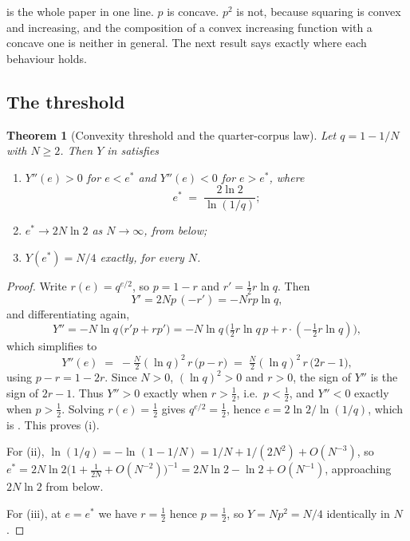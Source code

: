\documentclass[11pt,twocolumn,a4paper]{article}
\theoremstyle{thmstyle}
\newtheorem{theorem}{Theorem}[section]
\theoremstyle{definition}
\theoremstyle{remark}
\newcommand{\eff}{e}
\newcommand{\estar}{e^{*}}
\newcommand{\yield}{Y}
\begin{document}
 is the whole paper in one line. $p$ is concave. $p^{2}$
is not, because squaring is convex and increasing, and the composition of
a convex increasing function with a concave one is neither in general.
The next result says exactly where each behaviour holds.

\subsection{The threshold}

\begin{theorem}[Convexity threshold and the quarter-corpus law]
\label{thm:threshold}
Let $q=1-1/N$ with $N\ge2$. Then $\yield$ in  satisfies
\begin{enumerate}[label=(\roman*),leftmargin=1.8em,itemsep=2pt]
\item $\yield''(\eff)>0$ for $\eff<\estar$ and $\yield''(\eff)<0$ for
$\eff>\estar$, where
\begin{equation}
\label{eq:estar}
\estar \;=\; \frac{2\ln 2}{\ln(1/q)};
\end{equation}
\item $\estar \to 2N\ln 2$ as $N\to\infty$, from below;
\item $\yield(\estar) = N/4$ \emph{exactly}, for every $N$.
\end{enumerate}
\end{theorem}

\begin{proof}
Write $r(\eff)=q^{\eff/2}$, so $p=1-r$ and $r'=\tfrac12 r\ln q$. Then
\[
\yield' = 2Np\,(-r') = -N r p \ln q ,
\]
and differentiating again,
\[
\yield'' = -N\ln q\,\big(r'p + r p'\big)
         = -N\ln q\,\big(\tfrac12 r\ln q\,p + r\cdot(-\tfrac12 r \ln q)\big),
\]
which simplifies to
\begin{equation}
\label{eq:secondderiv}
\yield''(\eff) \;=\; -\tfrac{N}{2}(\ln q)^{2}\, r\,\big(p-r\big)
\;=\; \tfrac{N}{2}(\ln q)^{2}\, r\,\big(2r-1\big),
\end{equation}
using $p-r=1-2r$. Since $N>0$, $(\ln q)^{2}>0$ and $r>0$, the sign of
$\yield''$ is the sign of $2r-1$. Thus $\yield''>0$ exactly when
$r>\tfrac12$, i.e.\ $p<\tfrac12$, and $\yield''<0$ exactly when
$p>\tfrac12$. Solving $r(\eff)=\tfrac12$ gives
$q^{\eff/2}=\tfrac12$, hence $\eff=2\ln2/\ln(1/q)$, which is
. This proves (i).

For (ii), $\ln(1/q)=-\ln(1-1/N)=1/N+1/(2N^{2})+O(N^{-3})$, so
$\estar = 2N\ln2\big(1+\tfrac{1}{2N}+O(N^{-2})\big)^{-1}
        = 2N\ln 2 - \ln 2 + O(N^{-1})$,
approaching $2N\ln2$ from below.

For (iii), at $\eff=\estar$ we have $r=\tfrac12$ hence $p=\tfrac12$,
so $\yield=Np^{2}=N/4$ identically in $N$.
\end{proof}
\end{document}
